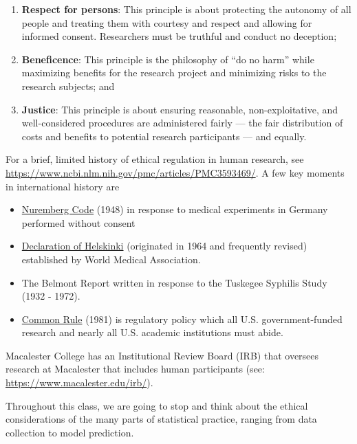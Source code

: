 \documentclass[
]{book}
\providecommand{\tightlist}{%
  \setlength{\itemsep}{0pt}\setlength{\parskip}{0pt}}
\begin{document}
\begin{enumerate}
\def\labelenumi{\arabic{enumi}.}
\item
  \textbf{Respect for persons}: This principle is about protecting the autonomy of all people and treating them with courtesy and respect and allowing for informed consent. Researchers must be truthful and conduct no deception;
\item
  \textbf{Beneficence}: This principle is the philosophy of ``do no harm'' while maximizing benefits for the research project and minimizing risks to the research subjects; and
\item
  \textbf{Justice}: This principle is about ensuring reasonable, non-exploitative, and well-considered procedures are administered fairly --- the fair distribution of costs and benefits to potential research participants --- and equally.
\end{enumerate}

For a brief, limited history of ethical regulation in human research, see \url{https://www.ncbi.nlm.nih.gov/pmc/articles/PMC3593469/}. A few key moments in international history are

\begin{itemize}
\tightlist
\item
  \href{https://www.nejm.org/doi/full/10.1056/NEJM199711133372006}{Nuremberg Code} (1948) in response to medical experiments in Germany performed without consent
\item
  \href{https://www.wma.net/what-we-do/medical-ethics/}{Declaration of Helskinki} (originated in 1964 and frequently revised) established by World Medical Association.
\item
  The Belmont Report written in response to the Tuskegee Syphilis Study (1932 - 1972).
\item
  \href{https://www.hhs.gov/ohrp/regulations-and-policy/regulations/common-rule/index.html}{Common Rule} (1981) is regulatory policy which all U.S. government-funded research and nearly all U.S. academic institutions must abide.
\end{itemize}

Macalester College has an Institutional Review Board (IRB) that oversees research at Macalester that includes human participants (see: \url{https://www.macalester.edu/irb/}).

Throughout this class, we are going to stop and think about the ethical considerations of the many parts of statistical practice, ranging from data collection to model prediction.
\end{document}
